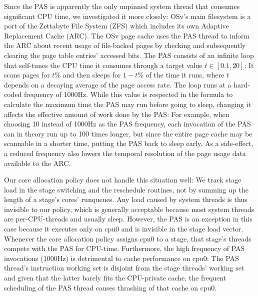 \documentclass[12pt,a4paper]{book}
\begin{document}
Since the PAS is apparently the only unpinned system thread that consumes significant CPU time, we investigated it more closely:
OSv's main filesystem is a port of the Zettabyte File System (ZFS) which includes its own Adaptive Replacement Cache (ARC).
The OSv page cache uses the PAS thread to inform the ARC about recent usage of file-backed pages by checking and subsequently clearing the page table entries' accessed bits.
The PAS consists of an infinite loop that self-tunes the CPU time it consumes through a target value $t \in [0.1, 20]$:
It scans pages for $t$\% and then sleeps for $1-t$\% of the time it runs, where $t$ depends on a decaying average of the page access rate.
The loop runs at a hard-coded frequency of 1000Hz.
While this value is respected in the formula to calculate the maximum time the PAS may run before going to sleep, changing it affects the effective amount of work done by the PAS:
For example, when choosing 10 instead of 1000Hz as the PAS frequency, each invocation of the PAS can in theory run up to 100 times longer, but since the entire page cache may be scannable in a shorter time, putting the PAS back to sleep early.
As a side-effect, a reduced frequency also lowers the temporal resolution of the page usage data available to the ARC.

Our core allocation policy does not handle this situation well:
We track stage load in the stage switching and the reschedule routines, not by summing up the length of a stage's cores' runqueues.
Any load caused by system threads is thus invisible to our policy, which is generally acceptable because most system threads are per-CPU-threads and usually sleep.
However, the PAS is an exception in this case because it executes only on cpu0 and is invisible in the stage load vector.
Whenever the core allocation policy assigns cpu0 to a stage, that stage's threads compete with the PAS for CPU-time.
Furthermore, the high frequency of PAS invocations (1000Hz) is detrimental to cache performance on cpu0:
The PAS thread's instruction working set is disjoint from the stage threads' working set and given that the latter barely fits the CPU-private cache, the frequent scheduling of the PAS thread causes thrashing of that cache on cpu0.
\end{document}
